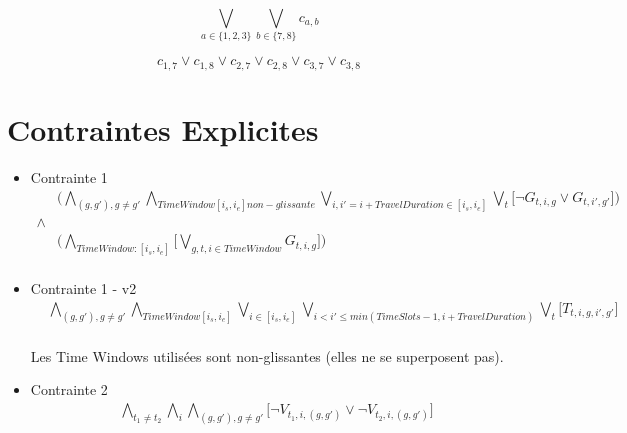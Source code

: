 \documentclass{article}
\begin{document}
 \begin{equation*}
\bigvee_{a \in \{1, 2, 3\}}
\bigvee_{b \in \{7, 8\}}
c_{a, b}
\end{equation*}

\begin{equation*}
c_{1, 7} \lor
c_{1, 8} \lor
c_{2, 7} \lor
c_{2, 8} \lor
c_{3, 7} \lor
c_{3, 8} 
\end{equation*}





\section{Contraintes Explicites}

\begin{itemize}

\item Contrainte 1
    \begin{equation*}
    \begin{split}
      & \big(\bigwedge_{(g,g'), g \neq g'} 
      \bigwedge_{TimeWindow [i_s,i_e] non-glissante}
      \bigvee_{i, i' = i+TravelDuration \in [i_s,i_e] }
      \bigvee_{t}
      \big[\neg G_{t,i,g} \lor G_{t,i',g'} \big] \big)\\
      \land \\
      &\big(\bigwedge_{TimeWindow:[i_s,i_e]}
      \big[\bigvee_{g, t, i \in TimeWindow} G_{t, i, g} \big]\big) \\
    \end{split}
    \end{equation*}
    
\item Contrainte 1 - v2
    \begin{equation*}
    \begin{split}
      & 
      \bigwedge_{(g,g'), g \neq g'} 
      \bigwedge_{TimeWindow [i_s,i_e]}
      \bigvee_{i \in [i_s,i_e]}
      \bigvee_{i < i' \leq min(TimeSlots - 1, i + TravelDuration)}
      \bigvee_{t}
      \big[T_{t,i,g,i', g'}] \\
    \end{split}
    \end{equation*}

Les Time Windows utilisées sont non-glissantes (elles ne se superposent pas).
    
\item Contrainte 2
    \begin{equation*}
    \begin{split}
      & \bigwedge_{t_1 \neq t_2}
      \bigwedge_{i}
      \bigwedge_{(g,g'), g \neq g'} \big[
      \neg V_{t_1,i,(g,g')} \lor \neg V_{t_2,i,(g,g')} \big] \\
    \end{split}
    \end{equation*}
    

\end{itemize}
\end{document}
